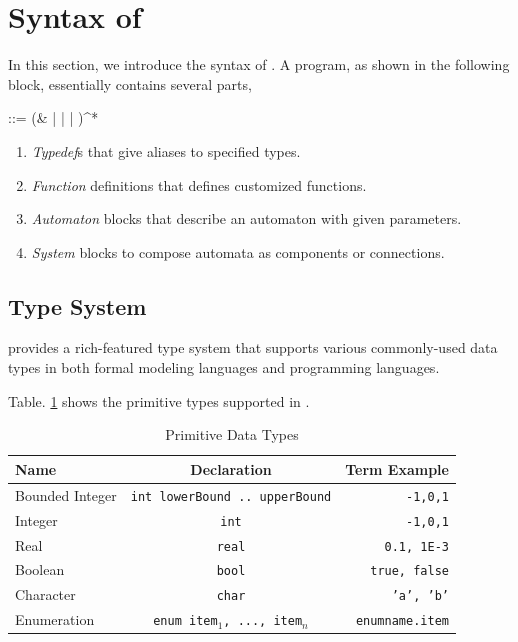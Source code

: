 \section{Syntax of \lang{}}
\label{sec:syntax}

In this section, we introduce the syntax of \lang{}. A \lang{} program, as shown in the following block, essentially contains several parts,
\begin{bnf}
     ::=  (&  |  |  | )^*
\end{bnf}

\begin{enumerate}
    \item \emph{Typedef}s that give aliases to specified types.
    \item \emph{Function} definitions that defines customized functions.
    \item \emph{Automaton} blocks that describe an automaton with given parameters.
    \item \emph{System} blocks to compose automata as components or connections.
\end{enumerate}

\subsection{Type System}
\label{subsec:typesystem}
\lang{} provides a rich-featured type system that supports various commonly-used data types in both formal modeling languages and programming languages.

 Table. \ref{table:primitivetypes} shows the primitive types supported in \lang{}.

\begin{table}
    \caption{Primitive Data Types}
    \label{table:primitivetypes}
    \centering
    \begin{tabular}{lcr}
        \hline
        Name & Declaration & Term Example \T\B \\
        \hline
        \T Bounded Integer\hspace{0.5cm} & \texttt{int lowerBound .. upperBound}\hspace{0.5cm} & \texttt{-1,0,1} \\
        Integer & \texttt{int} & \texttt{-1,0,1} \\
        Real & \texttt{real} & \texttt{0.1, 1E-3} \\
        Boolean & \texttt{bool} & \texttt{true, false} \\
        Character & \texttt{char} & \texttt{'a', 'b'} \\
        \B Enumeration & \texttt{enum {item$_1$, ..., item$_n$}} & \texttt{enumname.item} \\
        \hline
    \end{tabular}
\end{table}

